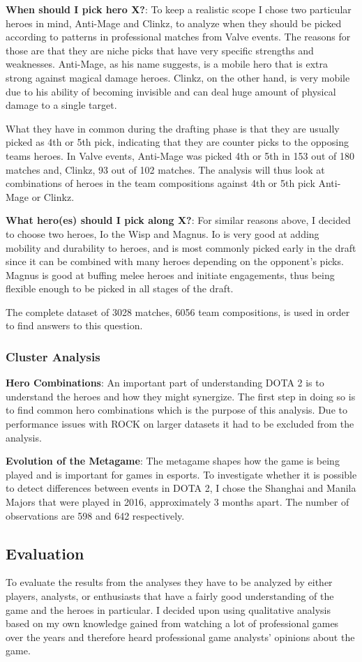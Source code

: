 \documentclass[report.tex]{subfiles}
\begin{document}
\textbf{When should I pick hero X?}: To keep a realistic scope I chose two particular heroes in mind, Anti-Mage and Clinkz, to analyze when they should be picked according to patterns in professional matches from Valve events. The reasons for those are that they are niche picks that have very specific strengths and weaknesses. Anti-Mage, as his name suggests, is a mobile hero that is extra strong against magical damage heroes. Clinkz, on the other hand, is very mobile due to his ability of becoming invisible and can deal huge amount of physical damage to a single target.

What they have in common during the drafting phase is that they are usually picked as 4th or 5th pick, indicating that they are counter picks to the opposing teams heroes. In Valve events, Anti-Mage was picked 4th or 5th in 153 out of 180 matches and, Clinkz, 93 out of 102 matches. The analysis will thus look at combinations of heroes in the team compositions against 4th or 5th pick Anti-Mage or Clinkz.

\textbf{What hero(es) should I pick along X?}: For similar reasons above, I decided to choose two heroes, Io the Wisp and Magnus. Io is very good at adding mobility and durability to heroes, and is most commonly picked early in the draft since it can be combined with many heroes depending on the opponent's picks. Magnus is good at buffing melee heroes and initiate engagements, thus being flexible enough to be picked in all stages of the draft.

The complete dataset of 3028 matches, 6056 team compositions, is used in order to find answers to this question.

\subsubsection*{Cluster Analysis}

\textbf{Hero Combinations}: An important part of understanding DOTA 2 is to understand the heroes and how they might synergize. The first step in doing so is to find common hero combinations which is the purpose of this analysis. Due to performance issues with ROCK on larger datasets it had to be excluded from the analysis.

\textbf{Evolution of the Metagame}: The metagame shapes how the game is being played and is important for games in esports. To investigate whether it is possible to detect differences between events in DOTA 2, I chose the Shanghai and Manila Majors that were played in 2016, approximately 3 months apart. The number of observations are 598 and 642 respectively.

\subsection*{Evaluation}

To evaluate the results from the analyses they have to be analyzed by either players, analysts, or enthusiasts that have a fairly good understanding of the game and the heroes in particular. I decided upon using qualitative analysis based on my own knowledge gained from watching a lot of professional games over the years and therefore heard professional game analysts' opinions about the game.
\end{document}
